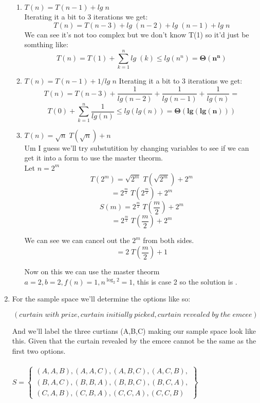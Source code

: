 \documentclass{article}
\begin{document}
\begin{enumerate}
\begin{enumerate}
      \item $T(n) = T(n - 1) + lg\;n$ \\
      Iterating it a bit to 3 iterations we get:
      \[T(n) = T(n - 3) + lg\;(n - 2) + lg\;(n - 1) + lg\;n\]
      We can see it's not too complex but we don't know T(1) so it'd just be somthing like:
      \[T(n) = T(1) + \sum_{k=1}^{n} lg\;(k) \leq lg(n^n) = \bm{\Theta(n^n)}\]

      \item $T(n) = T(n - 1) + 1/lg\;n$
      Iterating it a bit to 3 iterations we get:
      \[T(n) = T(n - 3) + \frac{1}{lg(n - 2)} + \frac{1}{lg(n - 1)} + \frac{1}{lg(n)} =\]
      \[T(0) + \sum_{k=1}^{n} \frac{1}{lg(n)} \leq lg(lg(n)) = \bm{\Theta(lg(lg(n)))}\]
            
      \item $T(n) = \sqrt{n}\;T(\sqrt{n}) + n$ \\
      Um I guess we'll try substutition by changing variables to see if we can get it into a form to use the master theorm. \\
      Let $n = 2^m$
      \[T(2^m) = \sqrt{2^m}\;T(\sqrt{2^m}) + 2^m\]
      \[ = 2^{\frac{m}{2}}\;T(2^{\frac{m}{2}}) + 2^{m}\]
      \[S(m) = 2^{\frac{m}{2}}\;T(\frac{m}{2}) + 2^{m}\]
      \[     = 2^{\frac{m}{2}}\;T(\frac{m}{2}) + 2^{m}\]

      We can see we can cancel out the $2^{m}$ from both sides.
      \[     = 2\;T(\frac{m}{2}) + 1\]

      Now on this we can use the master theorm $a = 2, b = 2, f(n) = 1, n^{\log_2 2} = 1$, this is case 2 so the solution is .

    \end{enumerate}

    \item For the sample space we'll determine the options like so:
    
    \[(curtain\;with\;prize, curtain\;initially\;picked, curtain\;revealed\;by\;the\;emcee)\]
    
    And we'll label the three curtians (A,B,C) making our sample space look like this. Given that the curtain revealed by the emcee cannot be the same as the first two options. \\\\
    
    \begin{math} S =
      \left\{
        \begin{array}{l}
          (A,A,B),(A,A,C),(A,B,C),(A,C,B), \\
          (B,A,C),(B,B,A),(B,B,C),(B,C,A), \\
          (C,A,B),(C,B,A),(C,C,A),(C,C,B)
        \end{array}
      \right\}
    \end{math} \\\\
    

\end{enumerate}
\end{document}
